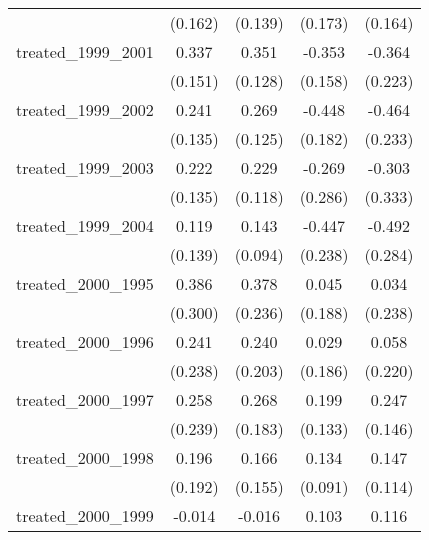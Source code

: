 {\begin{tabular}{l*{4}{c}}
            &     (0.162)         &     (0.139)         &     (0.173)         &     (0.164)         \\
[1em]
treated\_1999\_2001&       0.337\sym{*}  &       0.351\sym{**} &      -0.353\sym{*}  &      -0.364         \\
            &     (0.151)         &     (0.128)         &     (0.158)         &     (0.223)         \\
[1em]
treated\_1999\_2002&       0.241         &       0.269\sym{*}  &      -0.448\sym{*}  &      -0.464\sym{*}  \\
            &     (0.135)         &     (0.125)         &     (0.182)         &     (0.233)         \\
[1em]
treated\_1999\_2003&       0.222         &       0.229         &      -0.269         &      -0.303         \\
            &     (0.135)         &     (0.118)         &     (0.286)         &     (0.333)         \\
[1em]
treated\_1999\_2004&       0.119         &       0.143         &      -0.447         &      -0.492         \\
            &     (0.139)         &     (0.094)         &     (0.238)         &     (0.284)         \\
[1em]
treated\_2000\_1995&       0.386         &       0.378         &       0.045         &       0.034         \\
            &     (0.300)         &     (0.236)         &     (0.188)         &     (0.238)         \\
[1em]
treated\_2000\_1996&       0.241         &       0.240         &       0.029         &       0.058         \\
            &     (0.238)         &     (0.203)         &     (0.186)         &     (0.220)         \\
[1em]
treated\_2000\_1997&       0.258         &       0.268         &       0.199         &       0.247         \\
            &     (0.239)         &     (0.183)         &     (0.133)         &     (0.146)         \\
[1em]
treated\_2000\_1998&       0.196         &       0.166         &       0.134         &       0.147         \\
            &     (0.192)         &     (0.155)         &     (0.091)         &     (0.114)         \\
[1em]
treated\_2000\_1999&      -0.014         &      -0.016         &       0.103         &       0.116         \\

\end{tabular}}
